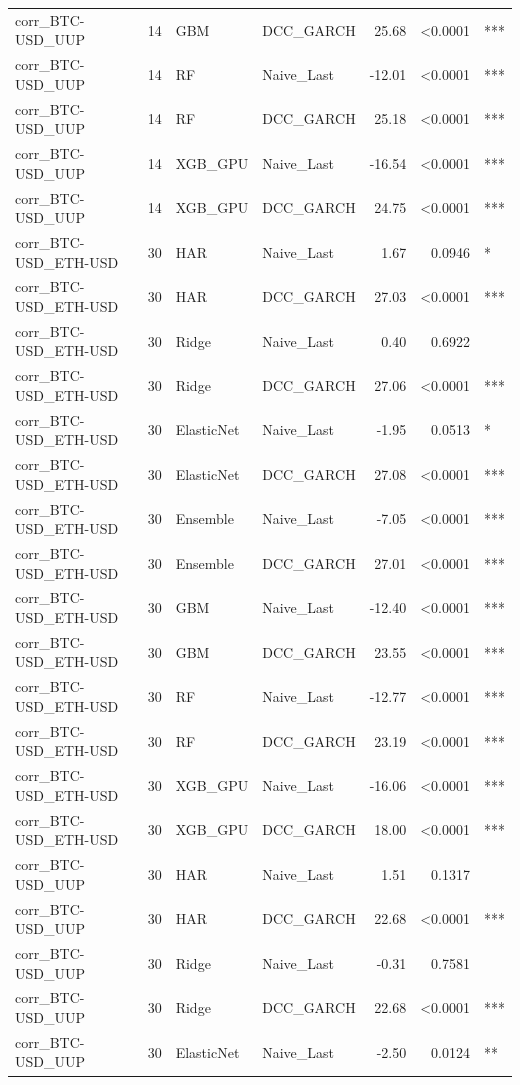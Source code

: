 \begin{table}[H]
\begin{tabular}{llllrrl}
corr_BTC-USD_UUP & 14 & GBM & DCC_GARCH & 25.68 & <0.0001 & *** \\
corr_BTC-USD_UUP & 14 & RF & Naive_Last & -12.01 & <0.0001 & *** \\
corr_BTC-USD_UUP & 14 & RF & DCC_GARCH & 25.18 & <0.0001 & *** \\
corr_BTC-USD_UUP & 14 & XGB_GPU & Naive_Last & -16.54 & <0.0001 & *** \\
corr_BTC-USD_UUP & 14 & XGB_GPU & DCC_GARCH & 24.75 & <0.0001 & *** \\
corr_BTC-USD_ETH-USD & 30 & HAR & Naive_Last & 1.67 & 0.0946 & * \\
corr_BTC-USD_ETH-USD & 30 & HAR & DCC_GARCH & 27.03 & <0.0001 & *** \\
corr_BTC-USD_ETH-USD & 30 & Ridge & Naive_Last & 0.40 & 0.6922 &  \\
corr_BTC-USD_ETH-USD & 30 & Ridge & DCC_GARCH & 27.06 & <0.0001 & *** \\
corr_BTC-USD_ETH-USD & 30 & ElasticNet & Naive_Last & -1.95 & 0.0513 & * \\
corr_BTC-USD_ETH-USD & 30 & ElasticNet & DCC_GARCH & 27.08 & <0.0001 & *** \\
corr_BTC-USD_ETH-USD & 30 & Ensemble & Naive_Last & -7.05 & <0.0001 & *** \\
corr_BTC-USD_ETH-USD & 30 & Ensemble & DCC_GARCH & 27.01 & <0.0001 & *** \\
corr_BTC-USD_ETH-USD & 30 & GBM & Naive_Last & -12.40 & <0.0001 & *** \\
corr_BTC-USD_ETH-USD & 30 & GBM & DCC_GARCH & 23.55 & <0.0001 & *** \\
corr_BTC-USD_ETH-USD & 30 & RF & Naive_Last & -12.77 & <0.0001 & *** \\
corr_BTC-USD_ETH-USD & 30 & RF & DCC_GARCH & 23.19 & <0.0001 & *** \\
corr_BTC-USD_ETH-USD & 30 & XGB_GPU & Naive_Last & -16.06 & <0.0001 & *** \\
corr_BTC-USD_ETH-USD & 30 & XGB_GPU & DCC_GARCH & 18.00 & <0.0001 & *** \\
corr_BTC-USD_UUP & 30 & HAR & Naive_Last & 1.51 & 0.1317 &  \\
corr_BTC-USD_UUP & 30 & HAR & DCC_GARCH & 22.68 & <0.0001 & *** \\
corr_BTC-USD_UUP & 30 & Ridge & Naive_Last & -0.31 & 0.7581 &  \\
corr_BTC-USD_UUP & 30 & Ridge & DCC_GARCH & 22.68 & <0.0001 & *** \\
corr_BTC-USD_UUP & 30 & ElasticNet & Naive_Last & -2.50 & 0.0124 & ** \\

\end{tabular}
\end{table}
